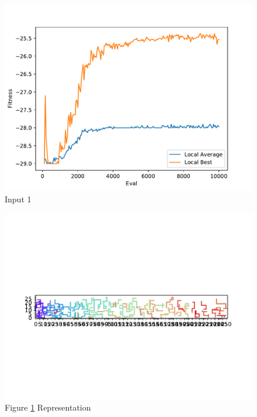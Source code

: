 \documentclass{standalone}
\begin{document}
\begin{figure}[!htb]
	\caption{Input 1}
	\label{fig:graph_1013}
	\includegraphics[width=\textwidth]{../graphs/graphs/1013.pdf}
\end{figure}


\begin{figure}[!htb]
	\caption{Figure \ref{fig:graph_1013} Representation}
	\label{fig:picture_1013}
	\includegraphics[width=\textwidth]{../graphs/picture/1013.pdf}
\end{figure}
\end{document}
